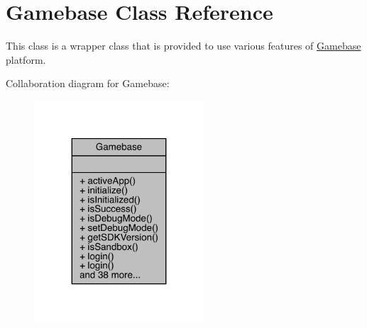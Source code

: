 \hypertarget{classcom_1_1toast_1_1android_1_1gamebase_1_1_gamebase}{}\section{Gamebase Class Reference}
\label{classcom_1_1toast_1_1android_1_1gamebase_1_1_gamebase}


This class is a wrapper class that is provided to use various features of \hyperlink{classcom_1_1toast_1_1android_1_1gamebase_1_1_gamebase}{Gamebase} platform.  




Collaboration diagram for Gamebase\+:
\nopagebreak
\begin{figure}[H]
\begin{center}
\leavevmode
\includegraphics[width=179pt]{classcom_1_1toast_1_1android_1_1gamebase_1_1_gamebase__coll__graph}
\end{center}
\end{figure}
